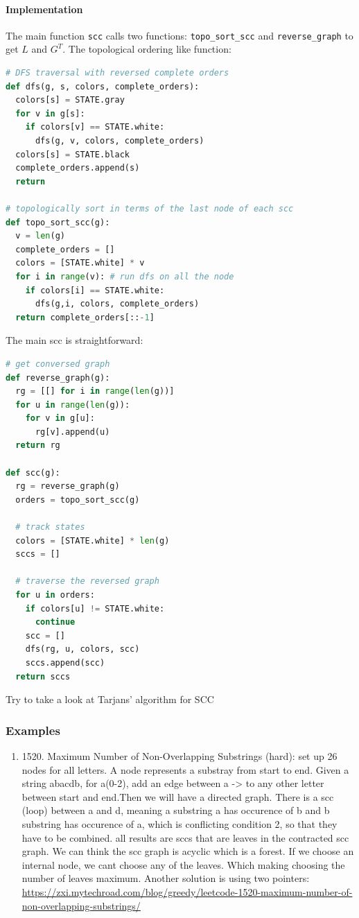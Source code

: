 \documentclass[../main.tex]{subfiles}
\begin{document}
\paragraph{Implementation} The main function \texttt{scc} calls two functions: \texttt{topo\_sort\_scc} and \texttt{reverse\_graph} to get $L$ and $G^T$. The topological ordering like function:
\begin{lstlisting}[language=Python]
# DFS traversal with reversed complete orders
def dfs(g, s, colors, complete_orders):
  colors[s] = STATE.gray
  for v in g[s]:
    if colors[v] == STATE.white:
      dfs(g, v, colors, complete_orders)
  colors[s] = STATE.black
  complete_orders.append(s)
  return
  
# topologically sort in terms of the last node of each scc
def topo_sort_scc(g):
  v = len(g)
  complete_orders = []
  colors = [STATE.white] * v
  for i in range(v): # run dfs on all the node
    if colors[i] == STATE.white:
      dfs(g,i, colors, complete_orders)
  return complete_orders[::-1]
\end{lstlisting}
The main scc is straightforward:
\begin{lstlisting}[language=Python]
# get conversed graph
def reverse_graph(g):
  rg = [[] for i in range(len(g))]
  for u in range(len(g)):
    for v in g[u]:
      rg[v].append(u)
  return rg
  
def scc(g):
  rg = reverse_graph(g)
  orders = topo_sort_scc(g)

  # track states
  colors = [STATE.white] * len(g)
  sccs = []

  # traverse the reversed graph
  for u in orders:
    if colors[u] != STATE.white:
      continue
    scc = []
    dfs(rg, u, colors, scc)
    sccs.append(scc)
  return sccs
\end{lstlisting}

\begin{bclogo}[couleur = blue!30, arrondi=0.1,logo=\bccrayon,ombre=true]{Try to take a look at Tarjans' algorithm for SCC} 
\end{bclogo}
\subsubsection{Examples}
\begin{enumerate}
    \item 1520. Maximum Number of Non-Overlapping Substrings (hard): set up 26 nodes for all letters. A node represents a substray from start to end.  Given a string abacdb, for a(0-2), add an edge between a -> to any other letter between start and end.Then we will have a directed graph. There is a scc (loop) between a and d, meaning a substring a has occurence of b and b substring has occurence of a, which is conflicting condition 2, so that they have to be combined. all results are sccs that are leaves in the contracted scc graph. We can think the scc graph is acyclic which is a forest. If we choose an internal node, we cant choose any of the leaves. Which making choosing the number of leaves maximum. Another solution is using two pointers: \url{https://zxi.mytechroad.com/blog/greedy/leetcode-1520-maximum-number-of-non-overlapping-substrings/}
\end{enumerate}
\end{document}

